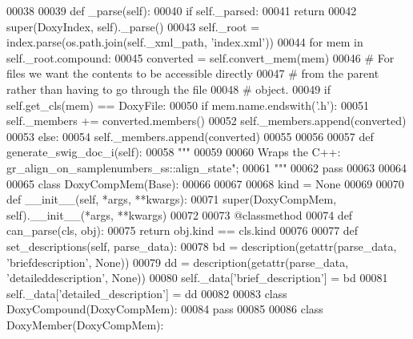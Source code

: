 \begin{DoxyCode}
00038 
00039     \textcolor{keyword}{def }_parse(self):
00040         \textcolor{keywordflow}{if} self.\_parsed:
00041             \textcolor{keywordflow}{return}
00042         super(DoxyIndex, self)._parse()
00043         self._root = index.parse(os.path.join(self.\_xml\_path, \textcolor{stringliteral}{'index.xml'}))
00044         \textcolor{keywordflow}{for} mem \textcolor{keywordflow}{in} self.\_root.compound:
00045             converted = self.convert\_mem(mem)
00046             \textcolor{comment}{# For files we want the contents to be accessible directly}
00047             \textcolor{comment}{# from the parent rather than having to go through the file}
00048             \textcolor{comment}{# object.}
00049             \textcolor{keywordflow}{if} self.get\_cls(mem) == DoxyFile:
00050                 \textcolor{keywordflow}{if} mem.name.endswith(\textcolor{stringliteral}{'.h'}):
00051                     self.\_members += converted.members()
00052                     self.\_members.append(converted)
00053             \textcolor{keywordflow}{else}:
00054                 self.\_members.append(converted)
00055 
00056 
00057 \textcolor{keyword}{def }generate_swig_doc_i(self):
00058     \textcolor{stringliteral}{"""}
00059 \textcolor{stringliteral}{    %
00060 \textcolor{stringliteral}{    Wraps the C++: gr\_align\_on\_samplenumbers\_ss::align\_state";}
00061 \textcolor{stringliteral}{    """}
00062     \textcolor{keywordflow}{pass}
00063 
00064 
00065 \textcolor{keyword}{class }DoxyCompMem(Base):
00066 
00067 
00068     kind = \textcolor{keywordtype}{None}
00069 
00070     \textcolor{keyword}{def }__init__(self, *args, **kwargs):
00071         super(DoxyCompMem, self).__init__(*args, **kwargs)
00072 
00073     @classmethod
00074     \textcolor{keyword}{def }can_parse(cls, obj):
00075         \textcolor{keywordflow}{return} obj.kind == cls.kind
00076 
00077     \textcolor{keyword}{def }set_descriptions(self, parse\_data):
00078         bd = description(getattr(parse\_data, \textcolor{stringliteral}{'briefdescription'}, \textcolor{keywordtype}{None}))
00079         dd = description(getattr(parse\_data, \textcolor{stringliteral}{'detaileddescription'}, \textcolor{keywordtype}{None}))
00080         self.\_data[\textcolor{stringliteral}{'brief\_description'}] = bd
00081         self.\_data[\textcolor{stringliteral}{'detailed\_description'}] = dd
00082 
00083 \textcolor{keyword}{class }DoxyCompound(DoxyCompMem):
00084     \textcolor{keywordflow}{pass}
00085 
00086 \textcolor{keyword}{class }DoxyMember(DoxyCompMem):
}
\end{DoxyCode}
